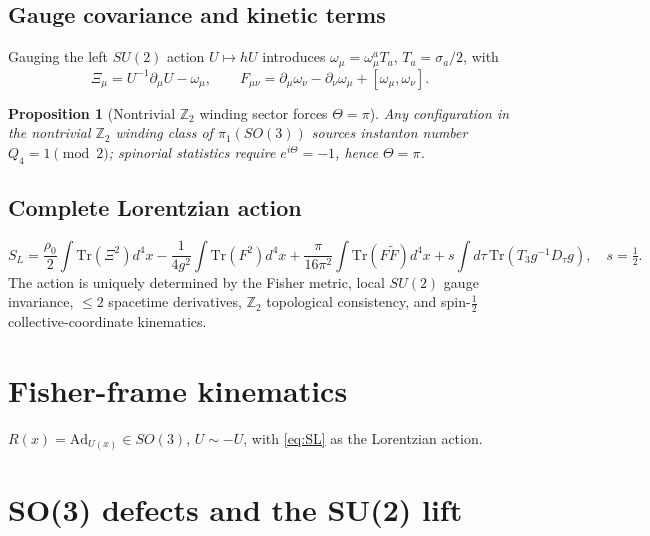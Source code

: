 \documentclass[12pt]{article}
\newtheorem{proposition}[theorem]{Proposition}
\theoremstyle{definition}
\theoremstyle{remark}
\begin{document}
\subsection{Gauge covariance and kinetic terms}

Gauging the left $SU(2)$ action $U\mapsto hU$ introduces
$\omega_\mu=\omega^a_\mu T_a$, $T_a=\sigma_a/2$, with
\begin{equation}
  \Xi_\mu=U^{-1}\partial_\mu U-\omega_\mu,\qquad
  F_{\mu\nu}=\partial_\mu\omega_\nu-\partial_\nu\omega_\mu+[\omega_\mu,\omega_\nu].
\end{equation}

\begin{proposition}[Nontrivial $\mathbb{Z}_2$ winding sector forces $\Theta=\pi$]
Any configuration in the nontrivial $\mathbb{Z}_2$ winding class of
$\pi_1(SO(3))$ sources instanton number
$Q_4=1\pmod{2}$; spinorial statistics require $e^{i\Theta}=-1$,
hence $\Theta=\pi$.
\end{proposition}

\subsection{Complete Lorentzian action}

\begin{equation}
\boxed{
S_L =
\frac{\rho_0}{2}\!\int\!\mathrm{Tr}(\Xi^2)d^4x
-\frac{1}{4g^2}\!\int\!\mathrm{Tr}(F^2)d^4x
+\frac{\pi}{16\pi^2}\!\int\!\mathrm{Tr}(F\widetilde{F})d^4x
+s\!\int\!d\tau\,\mathrm{Tr}(T_3 g^{-1}D_\tau g),\quad s=\tfrac{1}{2}.
}
\label{eq:SL}
\end{equation}
The action is uniquely determined by the Fisher metric, local $SU(2)$
gauge invariance, $\leq 2$ spacetime derivatives, $\mathbb{Z}_2$ topological
consistency, and spin-$\tfrac{1}{2}$ collective-coordinate kinematics.

\section{Fisher-frame kinematics}
\label{sec:kin}

$R(x)=\mathrm{Ad}_{U(x)}\in SO(3)$, $U\sim -U$, with \eqref{eq:SL} as
the Lorentzian action.

\section{SO(3) defects and the SU(2) lift}
\label{sec:defects}
\end{document}
